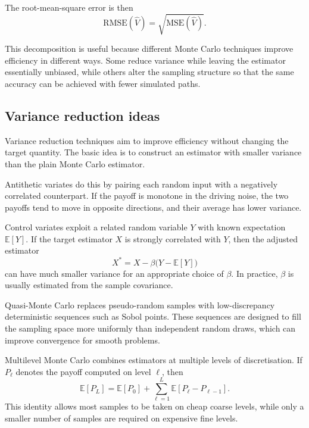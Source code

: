 \documentclass[11pt]{article}
\begin{document}
The root-mean-square error is then
\begin{equation}
\mathrm{RMSE}(\hat{V}) = \sqrt{\mathrm{MSE}(\hat{V})}.
\end{equation}

This decomposition is useful because different Monte Carlo techniques improve efficiency in different ways. Some reduce variance while leaving the estimator essentially unbiased, while others alter the sampling structure so that the same accuracy can be achieved with fewer simulated paths.

\subsection{Variance reduction ideas}

Variance reduction techniques aim to improve efficiency without changing the target quantity. The basic idea is to construct an estimator with smaller variance than the plain Monte Carlo estimator.

Antithetic variates do this by pairing each random input with a negatively correlated counterpart. If the payoff is monotone in the driving noise, the two payoffs tend to move in opposite directions, and their average has lower variance.

Control variates exploit a related random variable $Y$ with known expectation $\mathbb{E}[Y]$. If the target estimator $X$ is strongly correlated with $Y$, then the adjusted estimator
\begin{equation}
X^* = X - \beta\bigl(Y - \mathbb{E}[Y]\bigr)
\end{equation}
can have much smaller variance for an appropriate choice of $\beta$. In practice, $\beta$ is usually estimated from the sample covariance.

Quasi-Monte Carlo replaces pseudo-random samples with low-discrepancy deterministic sequences such as Sobol points. These sequences are designed to fill the sampling space more uniformly than independent random draws, which can improve convergence for smooth problems.

Multilevel Monte Carlo combines estimators at multiple levels of discretisation. If $P_\ell$ denotes the payoff computed on level $\ell$, then
\begin{equation}
\mathbb{E}[P_L] = \mathbb{E}[P_0] + \sum_{\ell=1}^{L}\mathbb{E}[P_\ell - P_{\ell-1}].
\end{equation}
This identity allows most samples to be taken on cheap coarse levels, while only a smaller number of samples are required on expensive fine levels.
\end{document}
